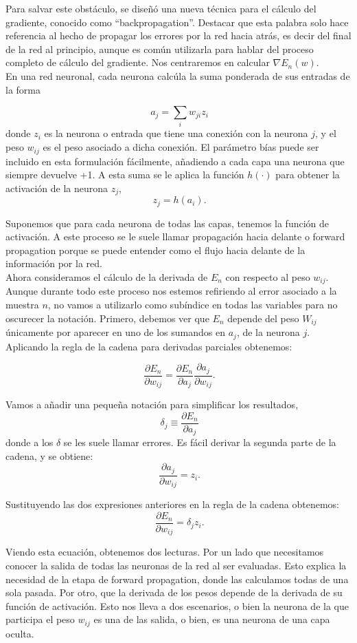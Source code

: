 Para salvar este obstáculo, se diseñó una nueva técnica para el cálculo del gradiente, conocido como ``backpropagation''. Destacar que esta palabra solo hace referencia al hecho de propagar los errores por la red hacia atrás, es decir del final de la red al principio, aunque es común utilizarla para hablar del proceso completo de cálculo del gradiente. Nos centraremos en calcular $\nabla E_n(w)$.\\
 
 
En una red neuronal, cada neurona calcúla la suma ponderada de sus entradas de la forma

\[
\ a_j = \sum_i w_{ji}z_i
\]donde $z_i$ es la neurona o entrada que tiene una conexión con la neurona $j$, y el peso $w_{ij}$ es el peso asociado a dicha conexión. El parámetro bías puede ser incluido en esta formulación fácilmente, añadiendo a cada capa una neurona que siempre devuelve +1. A esta suma se le aplica la función $h( \cdot )$ para obtener la activación de la neurona $z_j$,
\[
\ z_j = h(a_i).
\]

Suponemos que para cada neurona de todas las capas, tenemos la función de activación. A este proceso se le suele llamar propagación hacia delante o forward propagation porque se puede entender como el flujo hacia delante de la información por la red.\\

Ahora consideramos el cálculo de la derivada de $E_n$ con respecto al peso $w_{ij}$. Aunque durante todo este proceso nos estemos refiriendo al error asociado a la muestra $n$, no vamos a utilizarlo como subíndice en todas las variables para no oscurecer la notación. Primero, debemos ver que $E_n$ depende del peso $W_{ij}$ únicamente por aparecer en uno de los sumandos en $a_j$, de la neurona $j$. Aplicando la regla de la cadena para derivadas parciales obtenemos:

\[
\ \frac{\partial E_n}{\partial w_{ij}} = \frac{\partial E_n}{\partial a_j} \frac{\partial a_j}{\partial w_{ij}}.
\]

Vamos a añadir una pequeña notación para simplificar los resultados,
\[
\ \delta_j \equiv \frac{\partial E_n}{\partial a_j}
\]
donde a los $\delta$ se les suele llamar errores. Es fácil derivar la segunda parte de la cadena, y se obtiene:
\[
\ \frac{\partial a_j}{\partial w_{ij}} = z_i.
\]

Sustituyendo las dos expresiones anteriores en la regla de la cadena obtenemos:
\[
\ \frac{\partial E_n}{\partial w_{ij}} = \delta_j z_i.
\]

Viendo esta ecuación, obtenemos dos lecturas. Por un lado que necesitamos conocer la salida de todas las neuronas de la red al ser evaluadas. Esto explica la necesidad de la etapa de forward propagation, donde las calculamos todas de una sola pasada. Por otro, que la derivada de los pesos depende de la derivada de su función de activación. Esto nos lleva a dos escenarios, o bien la neurona de la que participa el peso $w_{ij}$ es una de las salida, o bien, es una neurona de una capa oculta.\\

